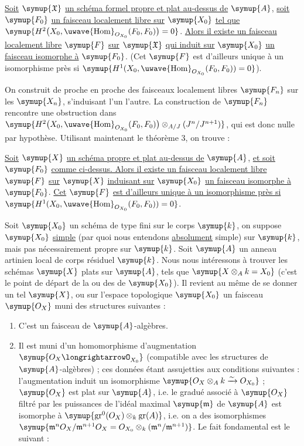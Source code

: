 \uline{Soit} $\symup{\mathfrak X}$ \uline{un schéma formel propre et plat
au-dessus de} $\symup{A}$, \uline{soit} $\symup{F_0}$ \uline{un faisceau localement libre sur} $\symup{X_0}$ \uline{tel que}
$\symup{H^2\bigl(X_0,\mathop{\text{\uwave{Hom}}}\nolimits_{O_{X_0}}(F_0,F_0)\bigr)=0}$.
\uline{Alors il existe un faisceau localement libre} $\symup{F}$ \uline{sur} $\symup{\mathfrak X}$ \uline{qui induit
sur} $\symup{X_0}$ \uline{un faisceau isomorphe à} $\symup{F_0}$. (Cet $\symup{F}$ est d'ailleurs unique à un
isomorphisme près si
$\symup{H^1(X_0,\mathop{\text{\uwave{Hom}}}\nolimits_{O_{X_0}}(F_0,F_0))=0}$).

On construit de proche en proche des faisceaux localement libres $\symup{F_n}$ sur les
$\symup{X_n}$, s'induisant l'un l'autre. La construction de $\symup{F_n}$ rencontre une
obstruction dans
$\symup{H^2\bigl(X_0,\mathop{\text{\uwave{Hom}}}\nolimits_{O_{X_0}}(F_0,F_0)\bigr) \otimes_{A/J}(J^n/J^{n+1})}$,
qui est donc nulle par hypothèse. Utilisant maintenant le théorème 3, on
trouve :

 \uline{Soit} $\symup{X}$ \uline{un schéma propre et plat au-dessus de} $\symup{A}$, \uline{et
soit} $\symup{F_0}$ \uline{comme ci-dessus. Alors il existe un faisceau localement libre} $\symup{F}$
\uline{sur} $\symup{X}$ \uline{induisant sur} $\symup{X_0}$ \uline{un faisceau isomorphe à} $\symup{F_0}$. \uline{Cet} $\symup{F}$ \uline{est
d'ailleurs unique à un isomorphisme près si}
$\symup{H^1(X_0,\mathop{\text{\uwave{Hom}}}\nolimits_{O_{X_0}}(F_0,F_0))=0}$.

Soit $\symup{X_0}$ un schéma de type fini sur le corps $\symup{k}$, on suppose $\symup{X_0}$ \uline{simple}
(par quoi nous entendons \uline{absolument} simple) sur $\symup{k}$, mais pas nécessairement
propre sur $\symup{k}$. Soit $\symup{A}$ un anneau artinien local de corps résiduel $\symup{k}$. Nous
nous intéressons à trouver les schémas $\symup{X}$ plats sur $\symup{A}$, tels que
$\symup{X\otimes_A k=X_0}$ (c'est le point de départ de la  ou
des  de $\symup{X_0}$). Il revient au même de se donner un
tel $\symup{X}$, ou sur l'espace topologique $\symup{X_0}$ un faisceau $\symup{O_X}$ muni des
structures suivantes :
\begin{enumerate}
  \item[\textnormal{i.}] C'est un faisceau de $\symup{A}$-algèbres.
  \item[\textnormal{ii.}] Il est muni d'un homomorphisme d'augmentation
    $\symup{O_X\longrightarrowO_{X_0}}$ (compatible avec les structures de
    $\symup{A}$-algèbres) ; ces données étant assujetties aux conditions suivantes :
    l'augmentation induit un isomorphisme
    $\symup{O_X\otimes_A k\xrightarrow{\sim}O_{X_0}}$ ; $\symup{O_X}$ est plat sur
    $\symup{A}$, i.e. le gradué associé à $\symup{O_X}$ filtré par les puissances de l'idéal
    maximal $\symup{\mathfrak m}$ de $\symup{A}$ est isomorphe à
    $\symup{\operatorname{gr}^0(O_X)\otimes_k\operatorname{gr}(A)}$, i.e. on a des
    isomorphismes
    $\symup{\mathfrak m^nO_X/\mathfrak m^{n+1}O_X =O_{X_0}\otimes_k(\mathfrak m^n/\mathfrak m^{n+1})}$.
Le fait fondamental est le suivant :
\end{enumerate}

